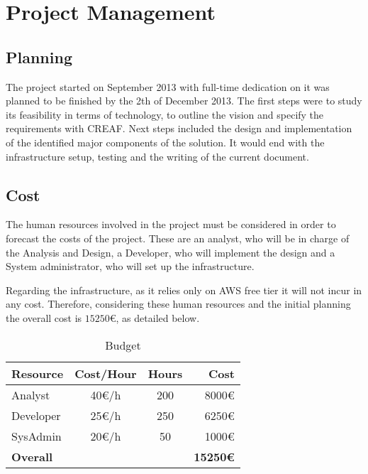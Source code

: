 \chapter{Project Management}

\section{Planning}

The project started on September 2013 with full-time dedication on it was planned to be finished by the 2th of December 2013. The first steps were to study its feasibility in terms of technology, to outline the vision and specify the requirements with CREAF. Next steps included the design and implementation of the identified major components of the solution. It would end with the infrastructure setup, testing and the writing of the current document.



\section{Cost}

The human resources involved in the project must be considered in order to forecast the costs of the project. These are an analyst, who will be in charge of the Analysis and Design, a Developer, who will implement the design and a System administrator, who will set up the infrastructure.

Regarding the infrastructure, as it relies only on AWS free tier it will not incur in any cost. Therefore, considering these human resources and the initial planning the overall cost is $15250\euro{}$, as detailed below.

\begin{table}[H]
    \centering
    \begin{tabular}{|l|c|c|r|}
    \hline
    \textbf{Resource}  & \textbf{Cost/Hour}  & \textbf{Hours}  & \textbf{Cost} \\ \hline
    Analyst            & 40\euro{}/h         & 200             & 8000\euro{}   \\ \hline
    Developer          & 25\euro{}/h         & 250             & 6250\euro{}   \\ \hline
    SysAdmin           & 20\euro{}/h         & 50              & 1000\euro{}    \\ \hline
    \textbf{Overall}   &                     &                 & \textbf{15250\euro{}} \\ \hline
    \end{tabular}
    \caption{Budget}
    \label{tab:budget}
\end{table}

